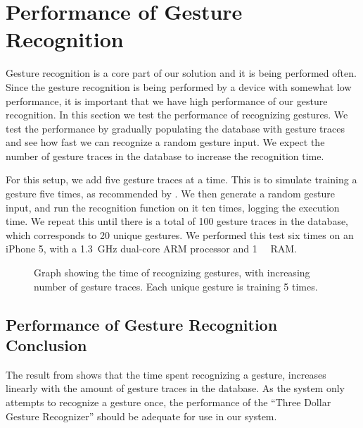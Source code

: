 \section{Performance of Gesture Recognition}\label{sec:gestureperformance}
Gesture recognition is a core part of our solution and it is being performed often. 
Since the gesture recognition is being performed by a device with somewhat low performance,
it is important that we have high performance of our gesture recognition. 
In this section we test the performance of recognizing gestures. 
We test the performance by gradually populating the database with gesture traces and see how fast we can recognize a random gesture input.
We expect the number of gesture traces in the database to increase the recognition time.

For this setup, we add five gesture traces at a time. 
This is to simulate training a gesture five times, 
as recommended by \cite{threedollar}. 
We then generate a random gesture input, 
and run the recognition function on it ten times, 
logging the execution time.
We repeat this until there is a total of \num{100} gesture traces in the database, 
which corresponds to \num{20} unique gestures.
We performed this test six times on an iPhone 5, 
with a \SI{1.3}{\giga\hertz} dual-core ARM processor and \SI{1}{\giga\byte} RAM.

\begin{figure}[!htb]
    \centering
    
    \caption{Graph showing the time of recognizing gestures, with increasing number of gesture traces. Each unique gesture is training \num{5} times.}
    \label{fig:performancegraph}
\end{figure}

\subsection{Performance of Gesture Recognition Conclusion}
The result from  shows that the time spent recognizing a gesture, 
increases linearly with the amount of gesture traces in the database.
As the system only attempts to recognize a gesture once, 
the performance of the ``Three Dollar Gesture Recognizer'' should be adequate for use in our system. 
